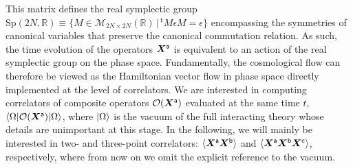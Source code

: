 \documentclass[11pt]{article}
\numberwithin{equation}{section} %
\begin{document}
This matrix defines the real symplectic group $\text{Sp}(2N, \mathbb{R}) \equiv \{M \in \mathcal{M}_{2N\times2N}(\mathbb{R}) \,|\, ^{\text{t}}M \epsilon M = \epsilon\}$ encompassing the symmetries of canonical variables that preserve the canonical commutation relation. As such, the time evolution of the operators $\bm{X}^{\sf{a}}$ is equivalent to an action of the real symplectic group on the phase space. Fundamentally, the cosmological flow can therefore be viewed as the Hamiltonian vector flow in phase space directly implemented at the level of correlators. We are interested in computing correlators of composite operators $\mathcal{O}(\bm{X}^{\sf{a}})$ evaluated at the same time $t$, $\braket{\Omega | \mathcal{O}(\bm{X}^{\sf{a}}) | \Omega}$, where $\ket{\Omega}$ is the vacuum of the full interacting theory whose details are unimportant at this stage. In the following, we will mainly be interested in two- and three-point correlators: $\braket{\bm{X}^{\sf{a}} \bm{X}^{\sf{b}}}$ and $\braket{\bm{X}^{\sf{a}} \bm{X}^{\sf{b}} \bm{X}^{\sf{c}}}$, respectively, where from now on we omit the explicit reference to the vacuum.
\end{document}
